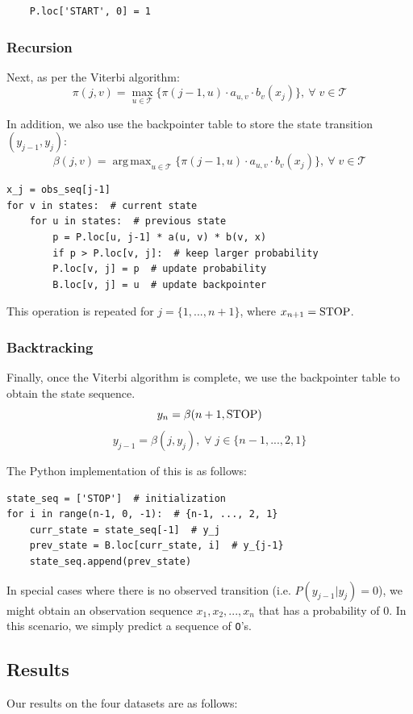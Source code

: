 \documentclass{article}
\DeclareMathOperator*{\argmax}{arg\,max}
\begin{document}
\begin{verbatim}
    P.loc['START', 0] = 1
\end{verbatim}

\subsubsection{Recursion}
Next, as per the Viterbi algorithm:
	$$ \pi(j, v) = \max_{u\in\mathcal{T}} \{ \pi(j-1, u) \cdot a_{u, v} \cdot b_v(x_j) \}, \: \forall\; v \in \mathcal{T} $$
	
In addition, we also use the backpointer table to store the state transition $(y_{j-1}, y_j)$:
	$$\beta(j, v) = \argmax_{u\in\mathcal{T}} \{ \pi(j-1, u) \cdot a_{u, v} \cdot b_v(x_j) \}, \: \forall\; v \in \mathcal{T} $$
	
\begin{verbatim}
x_j = obs_seq[j-1]
for v in states:  # current state
    for u in states:  # previous state
        p = P.loc[u, j-1] * a(u, v) * b(v, x)
        if p > P.loc[v, j]:  # keep larger probability
        P.loc[v, j] = p  # update probability
        B.loc[v, j] = u  # update backpointer
\end{verbatim}

This operation is repeated for $j = \{1, ..., n+1\}$, where $x_{n+1} = \text{\lstinline{STOP}}$.

\subsubsection{Backtracking}
Finally, once the Viterbi algorithm is complete, we use the backpointer table to obtain the state sequence.
	$$ y_{n} = \beta(n+1, \text{\lstinline{STOP}}) $$
	$$ y_{j-1} = \beta(j, y_j),\; \forall\; j \in \{n-1, ..., 2, 1\} $$

The Python implementation of this is as follows:
\begin{verbatim}
state_seq = ['STOP']  # initialization
for i in range(n-1, 0, -1):  # {n-1, ..., 2, 1}
    curr_state = state_seq[-1]  # y_j
    prev_state = B.loc[curr_state, i]  # y_{j-1}
    state_seq.append(prev_state)
\end{verbatim}

In special cases where there is no observed transition (i.e. $P(y_{j-1} | y_j) = 0$), we might obtain an observation sequence $x_1, x_2, ..., x_n$ that has a probability of $0$. In this scenario, we simply predict a sequence of \lstinline{O}'s.

\subsection{Results}
Our results on the four datasets are as follows:
\end{document}
